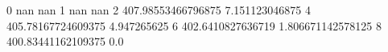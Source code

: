 0 nan nan
1 nan nan
2 407.98553466796875 7.151123046875
4 405.78167724609375 4.947265625
6 402.6410827636719 1.806671142578125
8 400.83441162109375 0.0
